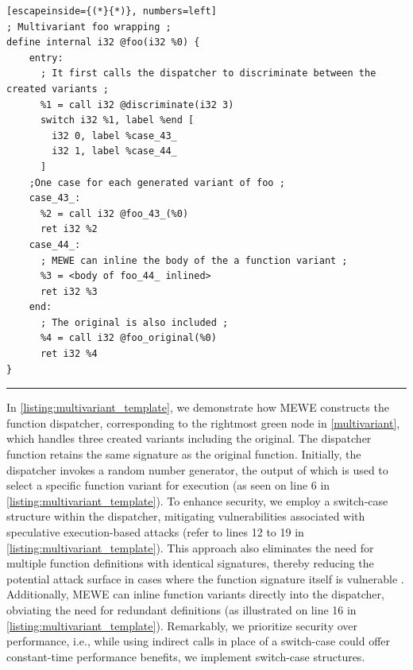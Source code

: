 \begin{minipage}[t]{0.9\linewidth}
\scriptsize
\centering
\noindent\begin{minipage}[b]{\linewidth}
    \begin{minipage}[t]{1\linewidth}
        \begin{lstlisting}[escapeinside={(*}{*)}, numbers=left]
; Multivariant foo wrapping ;
define internal i32 @foo(i32 %0) {
    entry:
      ; It first calls the dispatcher to discriminate between the created variants ;
      %1 = call i32 @discriminate(i32 3)
      switch i32 %1, label %end [
        i32 0, label %case_43_
        i32 1, label %case_44_
      ]
    ;One case for each generated variant of foo ;
    case_43_:                 
      %2 = call i32 @foo_43_(%0)
      ret i32 %2
    case_44_:
      ; MEWE can inline the body of the a function variant ;
      %3 = <body of foo_44_ inlined>
      ret i32 %3
    end:                                  
      ; The original is also included ;           
      %4 = call i32 @foo_original(%0)
      ret i32 %4
}
        \end{lstlisting}
    \end{minipage}%
    
    \noindent\rule{\linewidth}{0.4pt}
    \label{listing:multivariant_template}
\end{minipage}
\end{minipage}


In \autoref{listing:multivariant_template}, we demonstrate how MEWE constructs the function dispatcher, corresponding to the rightmost green node in \autoref{multivariant}, which handles three created variants including the original. 
The dispatcher function retains the same signature as the original function. Initially, the dispatcher invokes a random number generator, the output of which is used to select a specific function variant for execution (as seen on line 6 in \autoref{listing:multivariant_template}). 
To enhance security, we employ a switch-case structure within the dispatcher, mitigating vulnerabilities associated with speculative execution-based attacks \cite{Narayan2021Swivel} (refer to lines 12 to 19 in \autoref{listing:multivariant_template}). 
This approach also eliminates the need for multiple function definitions with identical signatures, thereby reducing the potential attack surface in cases where the function signature itself is vulnerable \cite{johnson2021}.
Additionally, MEWE can inline function variants directly into the dispatcher, obviating the need for redundant definitions (as illustrated on line 16 in \autoref{listing:multivariant_template}). 
Remarkably, we prioritize security over performance, i.e., while using indirect calls in place of a switch-case could offer constant-time performance benefits, we implement switch-case structures.

